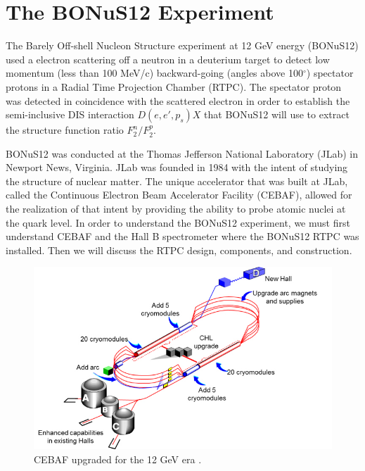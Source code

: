 \chapter{The BONuS12 Experiment}
\label{ch:bonus}
The Barely Off-shell Nucleon Structure experiment at 12 GeV energy (BONuS12) used a electron scattering off a neutron in a deuterium target to detect low momentum (less than 100 MeV/c) backward-going (angles above 100$^{\circ}$) spectator protons in a Radial Time Projection Chamber (RTPC). The spectator proton was detected in coincidence with the scattered electron in order to establish the semi-inclusive DIS interaction $D(e,e',p_s)X$ that BONuS12 will use to extract the structure function ratio $F_2^n/F_2^p$.

BONuS12 was conducted at the Thomas Jefferson National Laboratory (JLab) in Newport News, Virginia. JLab was founded in 1984 with the intent of studying the structure of nuclear matter. The unique accelerator that was built at JLab, called the Continuous Electron Beam Accelerator Facility (CEBAF), allowed for the realization of that intent by providing the ability to probe atomic nuclei at the quark level. In order to understand the BONuS12 experiment, we must first understand CEBAF and the Hall B spectrometer where the BONuS12 RTPC was installed. Then we will discuss the RTPC design, components, and construction.

\begin{figure}[h!]
	\centering
	\includegraphics[width=0.8\linewidth]{figures/cebaf.png}
	\caption[CEBAF upgraded for the 12 GeV era.]{CEBAF upgraded for the 12 GeV era \cite{pres:CEBAF}.}
	\label{fig:cebaf}
\end{figure}

